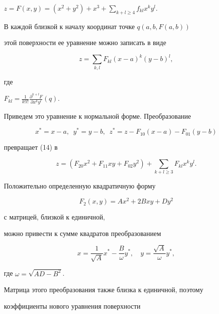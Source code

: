$z=F(x,y)=(x^2+y^2)+x^3+\sum\limits_{k+l \ge 4} f_{kl} x^k y^l$.





В каждой близкой к началу координат точке $q(a,b,F(a,b))$


этой поверхности ее уравнение можно записать в виде


\begin{equation}


z=\sum_{k,l} F_{kl} (x-a)^k (y-b)^l,


\end{equation}


где


$F_{kl}=\frac1{k! l!} \frac{\partial^{k+l} F}{\partial x^k y^l}(q)$.


Приведем это уравнение к нормальной форме. Преобразование


$$


x^*=x-a , \ \; y^*=y-b , \ \; z^*=z - F_{10} (x-a) -F_{01} (y-b)


$$


превращает (14) в


\begin{equation}


z=(F_{20} x^2+F_{11} x y+F_{02} y^2)+\sum_{k+l\ge 3} F_{kl} x^k y^l.


\end{equation}





Положительно определенную квадратичную форму


$$


F_2 (x,y)=A x^2+2 B xy+D y^2


$$


с матрицей, близкой к единичной,


можно привести к сумме квадратов преобразованием


\begin{equation}


x=\frac1{\sqrt{A}} x^* - \frac B{\omega} y^*, \quad


y=\frac{\sqrt{A}}{\omega} y^*,


\end{equation}


где $\omega=\sqrt {AD - B^2}$.


Матрица этого преобразования также близка к единичной, поэтому


коэффициенты нового уравнения поверхности


